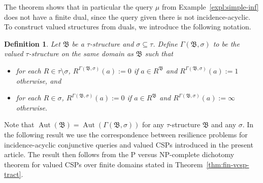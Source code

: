 \documentclass[nonacm]{acmart}
\newcommand{\bB}{{\mathfrak B}}
\DeclareMathOperator{\Aut}{Aut}
\newtheorem{definition}[theorem]{Definition}
\begin{document}
The theorem shows that in particular the query $\mu$ from
Example~\ref{expl:simple-inf} does not have a finite dual, since the query given there is not incidence-acyclic.
To construct valued structures from duals, we introduce the following notation.

\begin{definition}\label{def:valued-dual}
Let $\bB$ be a $\tau$-structure and $\sigma \subseteq \tau$. Define $\Gamma(\bB, \sigma)$ to be the valued $\tau$-structure on the same domain as $\bB$ such that
\begin{itemize}
    \item for each
    $R \in \tau \setminus \sigma$, $R^{\Gamma(\bB, \sigma)}(a) := 0$ if $a \in R^{\bB}$ and $R^{\Gamma(\bB, \sigma)}(a) := 1$ otherwise, and
    \item for each $R \in \sigma$, $R^{\Gamma(\bB, \sigma)}(a) := 0$ if $a \in R^{\bB}$ and $R^{\Gamma(\bB, \sigma)}(a) := \infty$ otherwise.
\end{itemize}
\end{definition}
Note that $\Aut(\bB) = \Aut(\Gamma(\bB, \sigma))$ for any $\tau$-structure $\bB$ and any $\sigma$. In the following result we use the correspondence between resilience problems for incidence-acyclic conjunctive queries and 
 valued CSPs introduced in the present article. 
 The result then follows from the P versus NP-complete dichotomy theorem
for valued CSPs over finite domains
stated in Theorem~\ref{thm:fin-vcsp-tract}. 
\end{document}
